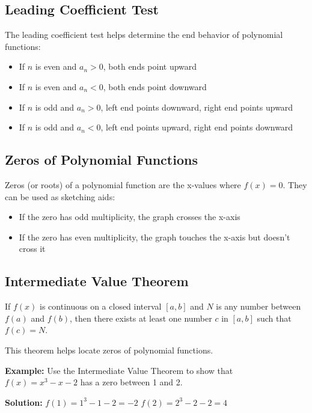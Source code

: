 \documentclass[12pt]{article}
\begin{document}
\subsection{Leading Coefficient Test}

The leading coefficient test helps determine the end behavior of polynomial functions:

\begin{itemize}
    \item If $n$ is even and $a_n > 0$, both ends point upward
    \item If $n$ is even and $a_n < 0$, both ends point downward
    \item If $n$ is odd and $a_n > 0$, left end points downward, right end points upward
    \item If $n$ is odd and $a_n < 0$, left end points upward, right end points downward
\end{itemize}

\subsection{Zeros of Polynomial Functions}

Zeros (or roots) of a polynomial function are the x-values where $f(x) = 0$. They can be used as sketching aids:

\begin{itemize}
    \item If the zero has odd multiplicity, the graph crosses the x-axis
    \item If the zero has even multiplicity, the graph touches the x-axis but doesn't cross it
\end{itemize}

\subsection{Intermediate Value Theorem}

If $f(x)$ is continuous on a closed interval $[a,b]$ and $N$ is any number between $f(a)$ and $f(b)$, then there exists at least one number $c$ in $[a,b]$ such that $f(c) = N$.

This theorem helps locate zeros of polynomial functions.

\textbf{Example:} Use the Intermediate Value Theorem to show that $f(x) = x^3 - x - 2$ has a zero between 1 and 2.

\textbf{Solution:}
$f(1) = 1^3 - 1 - 2 = -2$
$f(2) = 2^3 - 2 - 2 = 4$
\end{document}
